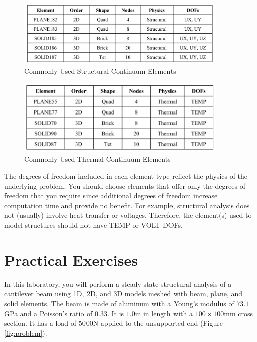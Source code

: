\documentclass[letterpaper,pdftex]{article}
\begin{document}
\begin{figure}[h]
   \centering
   \includegraphics[width=0.9\textwidth]{StructuralDOF}
   \caption{Commonly Used Structural Continuum Elements}
   \label{fig:structuralDOF}
\end{figure}

\begin{figure}[h]
   \centering
   \includegraphics[width=0.9\textwidth]{thermalDOF}
   \caption{Commonly Used Thermal Continuum Elements}
   \label{fig:thermalDOF}
\end{figure}

The degrees of freedom included in each element type reflect the physics of the underlying problem. You should choose elements that offer only the degrees of freedom that you require since additional degrees of freedom increase computation time and provide no benefit. For example, structural analysis does not (usually) involve heat transfer or voltages. Therefore, the element(s) used to model structures should not have TEMP or VOLT DOFs.


\section{Practical Exercises}

In this laboratory, you will perform a steady-state structural analysis of a cantilever beam using 1D, 2D, and 3D models meshed with beam, plane, and solid elements. The beam is made of aluminum with a Young’s modulus of $73.1$GPa and a Poisson’s ratio of $0.33$. It is $1.0$m in length with a $100\times100$mm cross section. It has a load of $5000$N applied to the unsupported end (Figure \ref{fig:problem}). 
\end{document}
